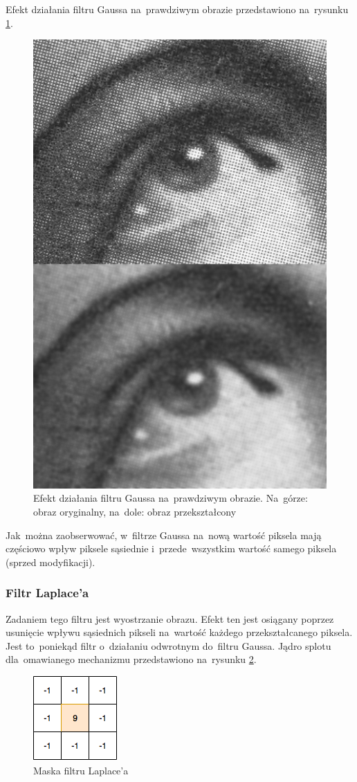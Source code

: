 Efekt działania filtru Gaussa na~prawdziwym obrazie przedstawiono na~rysunku \ref{rys:gauss-conv-example}.
\begin{figure}[H]
	\centering
	\includegraphics[width=0.4\linewidth]{img/gauss-conv-real-example.jpg}
	\caption{Efekt działania filtru Gaussa na~prawdziwym obrazie. Na~górze: obraz oryginalny, na~dole: obraz
	przekształcony}
	\label{rys:gauss-conv-example}
\end{figure}

Jak~można zaobserwować, w~filtrze Gaussa na~nową wartość piksela mają częściowo wpływ piksele sąsiednie
i~przede~wszystkim wartość samego piksela (sprzed modyfikacji).

\subsubsection{Filtr Laplace'a}
Zadaniem tego filtru jest wyostrzanie obrazu. Efekt ten jest osiągany poprzez usunięcie wpływu sąsiednich pikseli
na~wartość każdego przekształcanego piksela. Jest to~poniekąd filtr o~działaniu odwrotnym do~filtru Gaussa. Jądro splotu
dla~omawianego mechanizmu przedstawiono na~rysunku \ref{rys:maska-laplace}.

\begin{figure}[H]
	\centering
	\includegraphics[width=0.25\linewidth]{img/laplace-conv-kernel.png}
	\caption{Maska filtru Laplace'a}
	\label{rys:maska-laplace}
\end{figure}

